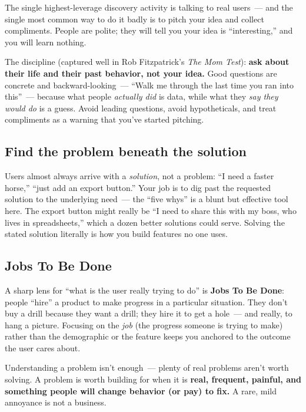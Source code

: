 The single highest-leverage discovery activity is talking to real users~--- and the single most
common way to do it badly is to pitch your idea and collect compliments. People are polite; they
will tell you your idea is ``interesting,'' and you will learn nothing.

The discipline (captured well in Rob Fitzpatrick's \emph{The Mom Test}): \textbf{ask about their life and their past behavior,
not your idea.} Good questions are concrete and backward-looking~--- ``Walk me through the last time
you ran into this''~--- because what people \emph{actually did} is data, while what they \emph{say they would do}
is a guess. Avoid leading questions, avoid hypotheticals, and treat compliments as a warning that
you've started pitching.

\subsection*{Find the problem beneath the solution}\label{product-discovery:find-the-problem-beneath-the-solution}

Users almost always arrive with a \emph{solution}, not a problem: ``I need a faster horse,'' ``just add an
export button.'' Your job is to dig past the requested solution to the underlying need~--- the ``five
whys'' is a blunt but effective tool here. The export button might really be ``I need to share this
with my boss, who lives in spreadsheets,'' which a dozen better solutions could serve. Solving the
stated solution literally is how you build features no one uses.

\subsection*{Jobs To Be Done}\label{product-discovery:jobs-to-be-done}

A sharp lens for ``what is the user really trying to do'' is \textbf{Jobs To Be Done}: people ``hire'' a
product to make progress in a particular situation. They don't buy a drill because they want a
drill; they hire it to get a hole~--- and really, to hang a picture. Focusing on the \emph{job} (the
progress someone is trying to make) rather than the demographic or the feature keeps you anchored to
the outcome the user cares about.

\label{product-discovery:validating-that-its-worth-solving}

Understanding a problem isn't enough~--- plenty of real problems aren't worth solving. A problem is
worth building for when it is \textbf{real, frequent, painful, and something people will change behavior
(or pay) to fix.} A rare, mild annoyance is not a business.

